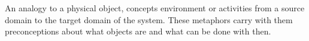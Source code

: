 \begin{definition}[Metaphor] \label{def:metaphor}  
 An analogy to a physical object, concepts environment or activities from a source domain to the target domain of the system. These metaphors carry with them preconceptions about what objects are and what can be done with then. \cite[p. 40]{rogers} \cite[p. 191-192]{benyon14} 
\end{definition}
